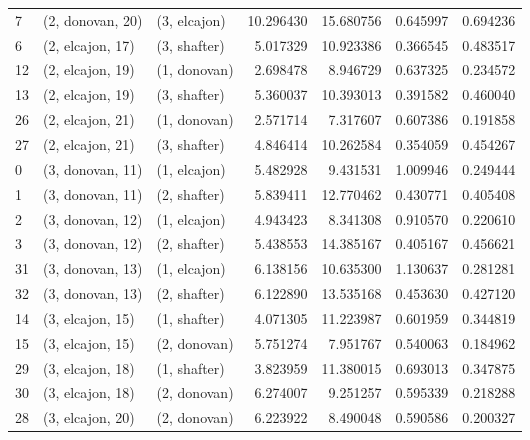 \begin{tabular}{lllrrrr}
7  &  (2, donovan, 20) &     (3, elcajon) &  10.296430 &  15.680756 &   0.645997 &  0.694236 \\
6  &  (2, elcajon, 17) &     (3, shafter) &   5.017329 &  10.923386 &   0.366545 &  0.483517 \\
12 &  (2, elcajon, 19) &     (1, donovan) &   2.698478 &   8.946729 &   0.637325 &  0.234572 \\
13 &  (2, elcajon, 19) &     (3, shafter) &   5.360037 &  10.393013 &   0.391582 &  0.460040 \\
26 &  (2, elcajon, 21) &     (1, donovan) &   2.571714 &   7.317607 &   0.607386 &  0.191858 \\
27 &  (2, elcajon, 21) &     (3, shafter) &   4.846414 &  10.262584 &   0.354059 &  0.454267 \\
0  &  (3, donovan, 11) &     (1, elcajon) &   5.482928 &   9.431531 &   1.009946 &  0.249444 \\
1  &  (3, donovan, 11) &     (2, shafter) &   5.839411 &  12.770462 &   0.430771 &  0.405408 \\
2  &  (3, donovan, 12) &     (1, elcajon) &   4.943423 &   8.341308 &   0.910570 &  0.220610 \\
3  &  (3, donovan, 12) &     (2, shafter) &   5.438553 &  14.385167 &   0.405167 &  0.456621 \\
31 &  (3, donovan, 13) &     (1, elcajon) &   6.138156 &  10.635300 &   1.130637 &  0.281281 \\
32 &  (3, donovan, 13) &     (2, shafter) &   6.122890 &  13.535168 &   0.453630 &  0.427120 \\
14 &  (3, elcajon, 15) &     (1, shafter) &   4.071305 &  11.223987 &   0.601959 &  0.344819 \\
15 &  (3, elcajon, 15) &     (2, donovan) &   5.751274 &   7.951767 &   0.540063 &  0.184962 \\
29 &  (3, elcajon, 18) &     (1, shafter) &   3.823959 &  11.380015 &   0.693013 &  0.347875 \\
30 &  (3, elcajon, 18) &     (2, donovan) &   6.274007 &   9.251257 &   0.595339 &  0.218288 \\
28 &  (3, elcajon, 20) &     (2, donovan) &   6.223922 &   8.490048 &   0.590586 &  0.200327 \\
\bottomrule
\end{tabular}
